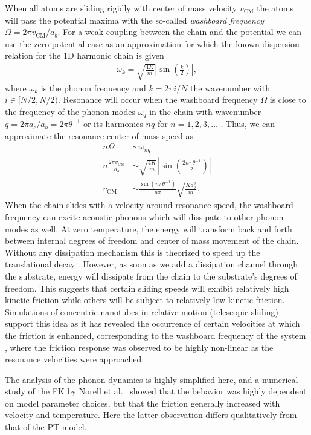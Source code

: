 When all atoms are sliding rigidly with center of mass velocity $v_{{\text{CM}}}$ the atoms will pass the potential maxima with the so-called \textit{washboard frequency} $\Omega = 2\pi v_{{\text{CM}}} / a_b$. For a weak coupling between the chain and the potential we can use the zero potential case as an approximation for which the known dispersion relation for the 1D harmonic chain is given \cite[p. 92]{Kittel2004}
\begin{align*}
  \omega_k = \sqrt{\frac{4 K}{m}} \left|\sin{\left(\frac{k}{2}\right)}\right|,
\end{align*}
where $\omega_k$ is the phonon frequency and $k = 2\pi i / N$ the wavenumber with $i\in [N/2, N/2)$. Resonance will occur when the washboard frequency $\Omega$ is close to the frequency of the phonon modes $\omega_q$ in the chain with wavenumber $q = 2\pi a_c / a_b = 2\pi \theta^{-1}$ or its harmonics $nq$ for $n = 1, 2, 3, \hdots$ \cite{van_den_Ende_2012}. Thus, we can approximate the resonance center of mass speed as
\begin{align*}
    n \Omega &\sim \omega_{nq} \\
    n \frac{2\pi v_{\text{CM}}}{a_b} &\sim \sqrt{\frac{4K}{m}} \left| \sin{\left(\frac{2n \pi \theta^{-1}}{2}\right)}\right| \\
    v_{\text{CM}} &\sim \frac{\sin{(n\pi \theta^{-1})}}{n \pi} \sqrt{\frac{Ka_b^2}{m}}.
\end{align*}
When the chain slides with a velocity around resonance speed, the washboard
frequency can excite acoustic phonons which will dissipate to other phonon modes
as well. At zero temperature, the energy will transform back and forth between
internal degrees of freedom and center of mass movement of the chain. Without any dissipation mechanism this is theorized to speed up the translational decay \cite{FK2D}. However, as soon as we add a dissipation channel through the substrate, energy will dissipate from the chain to the substrate's degrees of freedom. This suggests that certain sliding speeds will exhibit relatively high kinetic friction while
others will be subject to relatively low kinetic friction. Simulations of
concentric nanotubes in relative motion (telescopic sliding) support this idea as it has revealed the
occurrence of certain velocities at which the friction is enhanced, corresponding
to the washboard frequency of the system \cite{Manini_2016}, where the friction response was observed to be highly non-linear as the resonance velocities were
approached. 

The analysis of the phonon dynamics is highly simplified here, and a numerical study of the \acrshort{FK} by Norell et al.\ \cite{FK2D} showed that the behavior was highly dependent on model parameter choices, but that the friction generally increased with velocity and temperature. Here the latter observation differs qualitatively from that of the \acrshort{PT} model.



